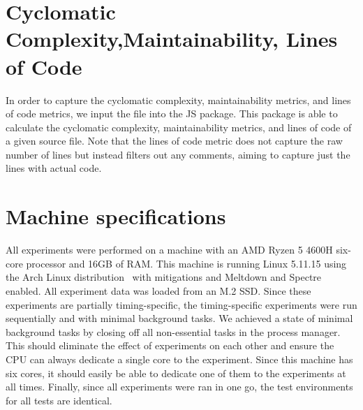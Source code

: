 \section{Cyclomatic Complexity,Maintainability, Lines of Code}
In order to capture the cyclomatic complexity, maintainability metrics, and lines of code metrics, we input the file into the  JS package. This package is able to calculate the cyclomatic complexity, maintainability metrics, and lines of code of a given source file. Note that the lines of code metric does not capture the raw number of lines but instead filters out any comments, aiming to capture just the lines with actual code.

\section{Machine specifications}\label{sec:experimental-setup:machine-specs}
All experiments were performed on a machine with an AMD Ryzen 5 4600H six-core processor and 16GB of RAM. This machine is running Linux 5.11.15 using the Arch Linux distribution~ with mitigations and Meltdown and Spectre enabled. All experiment data was loaded from an M.2 SSD. Since these experiments are partially timing-specific, the timing-specific experiments were run sequentially and with minimal background tasks. We achieved a state of minimal background tasks by closing off all non-essential tasks in the process manager. This should eliminate the effect of experiments on each other and ensure the CPU can always dedicate a single core to the experiment. Since this machine has six cores, it should easily be able to dedicate one of them to the experiments at all times. Finally, since all experiments were ran in one go, the test environments for all tests are identical.

